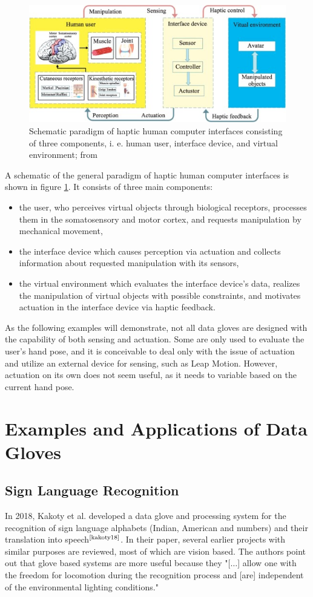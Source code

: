 \documentclass[hyperref, bachelorofscience]{cgvpub}
\newcommand{\newcite}[1]{$ ^{\text{\cite{#1}}} $}
\begin{document}
\begin{figure}
	\centering
	\includegraphics[width=.8\linewidth]{../pics/wang01}
	\caption[Schematic paradigm of haptic human computer interfaces]{Schematic paradigm of haptic human computer interfaces consisting of three components, i. e. human user, interface device, and virtual environment; from \cite{wang19}}
	\label{fig:hci}
\end{figure}

A schematic of the general paradigm of haptic human computer interfaces is shown in figure \ref{fig:hci}. It consists of three main components:
\begin{itemize}
	\item the user, who perceives virtual objects through biological receptors, processes them in the somatosensory and motor cortex, and requests manipulation by mechanical movement,
	\item the interface device which causes perception via actuation and collects information about requested manipulation with its sensors,
	\item the virtual environment which evaluates the interface device's data, realizes the manipulation of virtual objects with possible constraints, and motivates actuation in the interface device via haptic feedback.
\end{itemize}

As the following examples will demonstrate, not all data gloves are designed with the capability of both sensing and actuation. Some are only used to evaluate the user's hand pose, and it is conceivable to deal only with the issue of actuation and utilize an external device for sensing, such as Leap Motion. However, actuation on its own does not seem useful, as it needs to variable based on the current hand pose.

\section{Examples and Applications of Data Gloves}
\subsection{Sign Language Recognition}
In 2018, Kakoty et al. developed a data glove and processing system for the recognition of sign language alphabets (Indian, American and numbers) and their translation into speech\newcite{kakoty18}. In their paper, several earlier projects with similar purposes are reviewed, most of which are vision based. The authors point out that glove based systems are more useful because they "[$\dots$] allow one with the freedom for locomotion during the recognition process and [are] independent of the environmental lighting conditions."
\end{document}
